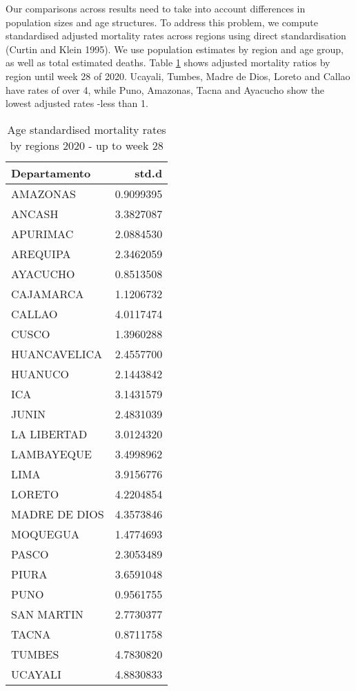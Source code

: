 \documentclass[
]{article}
\begin{document}
Our comparisons across results need to take into account differences in population sizes and age structures. To address this problem, we compute standardised adjusted mortality rates across regions using direct standardisation (Curtin and Klein 1995). We use population estimates by region and age group, as well as total estimated deaths. Table \ref{tab:smrd} shows adjusted mortality ratios by region until week 28 of 2020. Ucayali, Tumbes, Madre de Dios, Loreto and Callao have rates of over 4, while Puno, Amazonas, Tacna and Ayacucho show the lowest adjusted rates -less than 1.

\begin{table}[!h]

\caption{\label{tab:smrd}Age standardised mortality rates by regions 2020 - up to week 28}
\centering
\begin{tabular}[t]{lr}
\toprule
Departamento & std.d\\
\midrule
AMAZONAS & 0.9099395\\
ANCASH & 3.3827087\\
APURIMAC & 2.0884530\\
AREQUIPA & 2.3462059\\
AYACUCHO & 0.8513508\\
\addlinespace
CAJAMARCA & 1.1206732\\
CALLAO & 4.0117474\\
CUSCO & 1.3960288\\
HUANCAVELICA & 2.4557700\\
HUANUCO & 2.1443842\\
\addlinespace
ICA & 3.1431579\\
JUNIN & 2.4831039\\
LA LIBERTAD & 3.0124320\\
LAMBAYEQUE & 3.4998962\\
LIMA & 3.9156776\\
\addlinespace
LORETO & 4.2204854\\
MADRE DE DIOS & 4.3573846\\
MOQUEGUA & 1.4774693\\
PASCO & 2.3053489\\
PIURA & 3.6591048\\
\addlinespace
PUNO & 0.9561755\\
SAN MARTIN & 2.7730377\\
TACNA & 0.8711758\\
TUMBES & 4.7830820\\
UCAYALI & 4.8830833\\
\bottomrule
\end{tabular}
\end{table}
\end{document}
